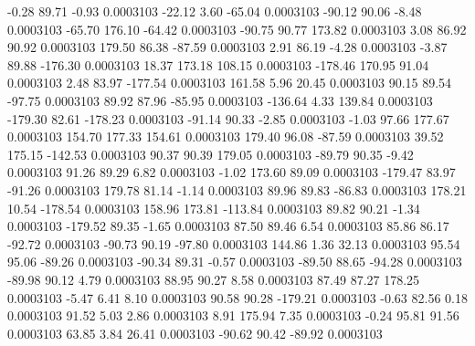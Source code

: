        -0.28       89.71       -0.93     0.0003103
      -22.12        3.60      -65.04     0.0003103
      -90.12       90.06       -8.48     0.0003103
      -65.70      176.10      -64.42     0.0003103
      -90.75       90.77      173.82     0.0003103
        3.08       86.92       90.92     0.0003103
      179.50       86.38      -87.59     0.0003103
        2.91       86.19       -4.28     0.0003103
       -3.87       89.88     -176.30     0.0003103
       18.37      173.18      108.15     0.0003103
     -178.46      170.95       91.04     0.0003103
        2.48       83.97     -177.54     0.0003103
      161.58        5.96       20.45     0.0003103
       90.15       89.54      -97.75     0.0003103
       89.92       87.96      -85.95     0.0003103
     -136.64        4.33      139.84     0.0003103
     -179.30       82.61     -178.23     0.0003103
      -91.14       90.33       -2.85     0.0003103
       -1.03       97.66      177.67     0.0003103
      154.70      177.33      154.61     0.0003103
      179.40       96.08      -87.59     0.0003103
       39.52      175.15     -142.53     0.0003103
       90.37       90.39      179.05     0.0003103
      -89.79       90.35       -9.42     0.0003103
       91.26       89.29        6.82     0.0003103
       -1.02      173.60       89.09     0.0003103
     -179.47       83.97      -91.26     0.0003103
      179.78       81.14       -1.14     0.0003103
       89.96       89.83      -86.83     0.0003103
      178.21       10.54     -178.54     0.0003103
      158.96      173.81     -113.84     0.0003103
       89.82       90.21       -1.34     0.0003103
     -179.52       89.35       -1.65     0.0003103
       87.50       89.46        6.54     0.0003103
       85.86       86.17      -92.72     0.0003103
      -90.73       90.19      -97.80     0.0003103
      144.86        1.36       32.13     0.0003103
       95.54       95.06      -89.26     0.0003103
      -90.34       89.31       -0.57     0.0003103
      -89.50       88.65      -94.28     0.0003103
      -89.98       90.12        4.79     0.0003103
       88.95       90.27        8.58     0.0003103
       87.49       87.27      178.25     0.0003103
       -5.47        6.41        8.10     0.0003103
       90.58       90.28     -179.21     0.0003103
       -0.63       82.56        0.18     0.0003103
       91.52        5.03        2.86     0.0003103
        8.91      175.94        7.35     0.0003103
       -0.24       95.81       91.56     0.0003103
       63.85        3.84       26.41     0.0003103
      -90.62       90.42      -89.92     0.0003103

